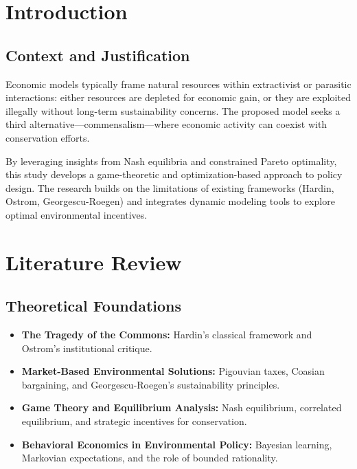 \documentclass[a4paper,12pt]{article}
\begin{document}
\newpage

\section{Introduction}

\subsection{Context and Justification}
Economic models typically frame natural resources within extractivist or parasitic interactions: either resources are depleted for economic gain, or they are exploited illegally without long-term sustainability concerns. The proposed model seeks a third alternative—commensalism—where economic activity can coexist with conservation efforts. 

By leveraging insights from Nash equilibria and constrained Pareto optimality, this study develops a game-theoretic and optimization-based approach to policy design. The research builds on the limitations of existing frameworks (Hardin, Ostrom, Georgescu-Roegen) and integrates dynamic modeling tools to explore optimal environmental incentives.

\newpage

\section{Literature Review}

\subsection{Theoretical Foundations}
\begin{itemize}
    \item \textbf{The Tragedy of the Commons:} Hardin’s classical framework and Ostrom’s institutional critique.
    \item \textbf{Market-Based Environmental Solutions:} Pigouvian taxes, Coasian bargaining, and Georgescu-Roegen’s sustainability principles.
    \item \textbf{Game Theory and Equilibrium Analysis:} Nash equilibrium, correlated equilibrium, and strategic incentives for conservation.
    \item \textbf{Behavioral Economics in Environmental Policy:} Bayesian learning, Markovian expectations, and the role of bounded rationality.
\end{itemize}
\end{document}
